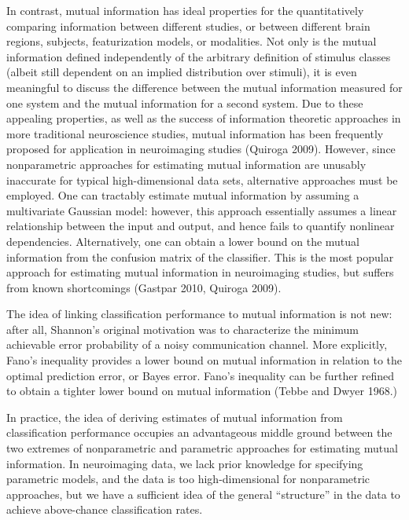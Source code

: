 \documentclass[12pt]{article}
\begin{document}
In contrast, mutual information has ideal properties for the
quantitatively comparing information between different studies, or
between different brain regions, subjects, featurization models, or
modalities.  Not only is the mutual information defined independently
of the arbitrary definition of stimulus classes (albeit still
dependent on an implied distribution over stimuli), it is even
meaningful to discuss the difference between the mutual information
measured for one system and the mutual information for a second
system.  Due to these appealing properties, as well as the success of
information theoretic approaches in more traditional neuroscience
studies, mutual information has been frequently proposed for
application in neuroimaging studies (Quiroga 2009).  However, since
nonparametric approaches for estimating mutual information are
unusably inaccurate for typical high-dimensional data sets,
alternative approaches must be employed.  One can tractably estimate
mutual information by assuming a multivariate Gaussian model: however,
this approach essentially assumes a linear relationship between the
input and output, and hence fails to quantify nonlinear dependencies.
Alternatively, one can obtain a lower bound on the mutual information
from the confusion matrix of the classifier.  This is the most popular
approach for estimating mutual information in neuroimaging studies,
but suffers from known shortcomings (Gastpar 2010, Quiroga 2009).

The idea of linking classification performance to mutual information is not new: 
after all, Shannon's original motivation was to characterize the minimum achievable error probability
of a noisy communication channel.  More explicitly, Fano's inequality provides a
lower bound on mutual information in relation to the optimal prediction error, or Bayes error.
Fano's inequality can be further refined to obtain a tighter lower bound on mutual information (Tebbe and Dwyer 1968.)

In practice, the idea of deriving estimates of mutual information from classification performance occupies an advantageous middle ground
between the two extremes of nonparametric and parametric approaches for estimating mutual information.
In neuroimaging data, we lack prior knowledge for specifying parametric models, and the data is too high-dimensional for nonparametric approaches,
but we have a sufficient idea of the general ``structure'' in the data to achieve above-chance classification rates.
\end{document}
